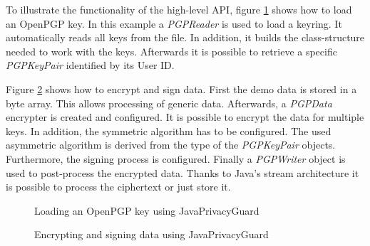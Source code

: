 To illustrate the functionality of the high-level API, figure \ref{fig:jpg:key} shows how to load an OpenPGP key. In this example a \textit{PGPReader} is used to load a keyring. It automatically reads all keys from the file. In addition, it builds the class-structure needed to work with the keys. Afterwards it is possible to retrieve a specific \textit{PGPKeyPair} identified by its User ID.

Figure \ref{fig:jpg:enc} shows how to encrypt and sign data. First the demo data is stored in a byte array. This allows processing of generic data. Afterwards, a \textit{PGPData} encrypter is created and configured. It is possible to encrypt the data for multiple keys. In addition, the symmetric algorithm has to be configured. The used asymmetric algorithm is derived from the type of the \textit{PGPKeyPair} objects. Furthermore, the signing process is configured. Finally a \textit{PGPWriter} object is used to post-process the encrypted data. Thanks to Java's stream architecture it is possible to process the ciphertext or just store it.

\begin{figure}[p]
	\centering
	
	\caption{Loading an OpenPGP key using JavaPrivacyGuard}
	\label{fig:jpg:key}
\end{figure}

\begin{figure}[p]
	\centering
	
	\caption{Encrypting and signing data using JavaPrivacyGuard}
	\label{fig:jpg:enc}
\end{figure}


%
%
%
%
%
%


